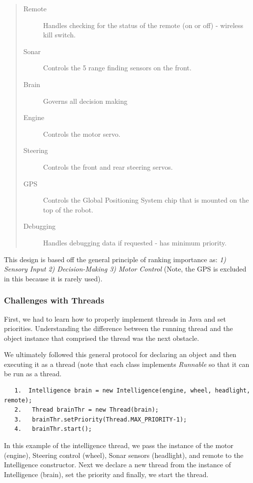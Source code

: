 \documentclass[12pt]{article}
\begin{document}
\begin{quote}
\begin{description}
\item[Remote] Handles checking for the status of the remote (on or off) - wireless kill switch.
\item[Sonar] Controls the 5 range finding sensors on the front.
\item[Brain] Governs all decision making
\item[Engine] Controls the motor servo.
\item[Steering] Controls the front and rear steering servos.
\item[GPS] Controls the Global Positioning System chip that is mounted on the top of the robot.
\item[Debugging] Handles debugging data if requested - has minimum priority.
\end{description}
\end{quote}

This design is based off the general principle of ranking importance as: \textit{1) Sensory Input 2) Decision-Making 3) Motor Control}  (Note, the GPS is excluded in this because it is rarely used).

\subsubsection*{Challenges with Threads}
First, we had to learn how to properly implement threads in Java and set priorities.  Understanding the difference between the running thread and the object instance that comprised the thread was the next obstacle.  

We ultimately followed this general protocol for declaring an object and then executing it as a thread (note that each class implements \textit{Runnable} so that it can be run as a thread.

\begin{verbatim}
   1.  Intelligence brain = new Intelligence(engine, wheel, headlight, remote);
   2.   Thread brainThr = new Thread(brain);
   3.   brainThr.setPriority(Thread.MAX_PRIORITY-1);
   4.   brainThr.start();
\end{verbatim}

In this example of the intelligence thread, we pass the instance of the motor (engine), Steering control (wheel), Sonar sensors (headlight), and remote to the Intelligence constructor.  Next we declare a new thread from the instance of Intelligence (brain), set the priority and finally, we start the thread.
\end{document}
